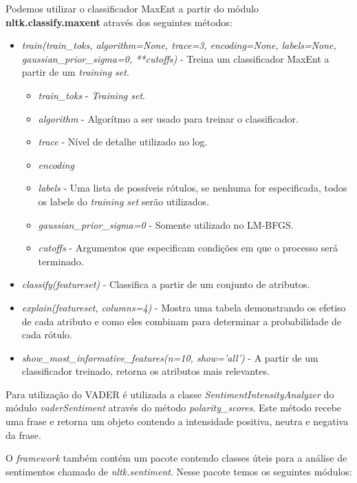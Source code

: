 Podemos utilizar o classificador \ac{MaxEnt} a partir do módulo
\textbf{nltk.classify.maxent} através dos seguintes métodos:

\begin{itemize}
  \item \textit{train(train\_toks, algorithm=None, trace=3,
  encoding=None, labels=None, gaussian\_prior\_sigma=0, **cutoffs)} - Treina um
  classificador \ac{MaxEnt} a partir de um \textit{training set}.
  \begin{itemize}
    \item \textit{train\_toks} - \textit{Training set}.
  \item \textit{algorithm} - Algorítmo a ser usado para treinar o classificador. 
  \item \textit{trace} - Nível de detalhe utilizado no log.
  \item \textit{encoding}
  \item \textit{labels} - Uma lista de possíveis rótulos, se nenhuma for
  especificada, todos os labels do \textit{training set} serão utilizados.
  \item \textit{gaussian\_prior\_sigma=0} - Somente utilizado no LM-BFGS.
  \item \textit{cutoffs} - Argumentos que especificam condições em que o
  processo será terminado.
  \end{itemize}
\item \textit{classify(featureset)} - Classifica a partir de um conjunto de
  atributos.
\item \textit{explain(featureset, columns=4)} - Mostra uma tabela demonstrando
os efetiso de cada atributo e como eles combinam para determinar a probabilidade
de cada rótulo.
\item \textit{show\_most\_informative\_features(n=10, show='all')} - A partir de
um classificador treinado, retorna os atributos mais relevantes.
\end{itemize}

Para utilização do \ac{VADER} é utilizada a classe
\textit{SentimentIntensityAnalyzer} do módulo \textit{vaderSentiment} através
do método \textit{polarity\_scores}. Este método recebe uma frase e retorna um
objeto contendo a intensidade positiva, neutra e negativa da frase.

O \textit{framework}
também contém um pacote contendo classes úteis para a análise de sentimentos
chamado de \textit{nltk.sentiment}. Nesse pacote temos os seguintes módulos:


